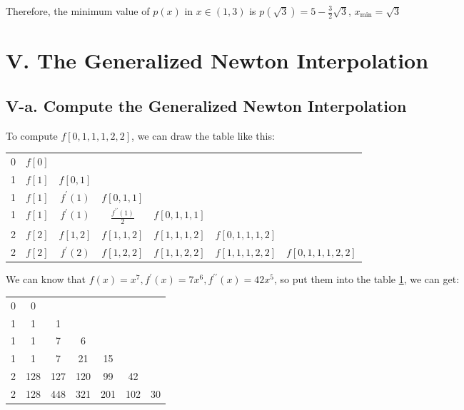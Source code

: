 \documentclass[a4paper]{article}
\begin{document}
Therefore, the minimum value of $p(x)$ in $x\in(1,3)$ is $p(\sqrt{3}) = 5 - \frac{3}{2}\sqrt{3}$, $x_{\min} = \sqrt{3}$

\section*{V. The Generalized Newton Interpolation}

\subsection*{V-a. Compute the Generalized Newton Interpolation}

To compute $f[0,1,1,1,2,2]$, we can draw the table like this:

\begin{table}[H]
  \centering
  \begin{tabular}{c|cccccc}
    0 & $f[0]$ &                 &                                  & & & \\
    1 & $f[1]$ & $f[0,1]$        &                                  & & & \\
    1 & $f[1]$ & $f^{\prime}(1)$ & $f[0,1,1]$                       & & & \\
    1 & $f[1]$ & $f^{\prime}(1)$ & $\frac{f^{\prime \prime}(1)}{2}$ & $f[0,1,1,1]$ & & \\
    2 & $f[2]$ & $f[1,2]$        & $f[1,1,2]$                       & $f[1,1,1,2]$ & $f[0,1,1,1,2]$ & \\
    2 & $f[2]$ & $f^{\prime}(2)$ & $f[1,2,2]$                       & $f[1,1,2,2]$ & $f[1,1,1,2,2]$ & $f[0,1,1,1,2,2]$ \\
  \end{tabular}
  \label{tabel::V-A.tabel1}
\end{table}

We can know that $f(x) = x^7, f^\prime(x)=7x^6, f^{\prime \prime}(x) = 42x^5$, so put them into the table \ref{tabel::V-A.tabel1}, we can get:

\begin{table}[H]
  \centering
  \begin{tabular}{c|cccccc}
    0 & 0   &     &     &     &     & \\
    1 & 1   & 1   &     &     &     & \\
    1 & 1   & 7   & 6   &     &     & \\
    1 & 1   & 7   & 21  & 15  &     & \\
    2 & 128 & 127 & 120 & 99  & 42  & \\
    2 & 128 & 448 & 321 & 201 & 102 & 30 \\
  \end{tabular}
  \label{tabel::V-A.tabel2}
\end{table}
\end{document}
